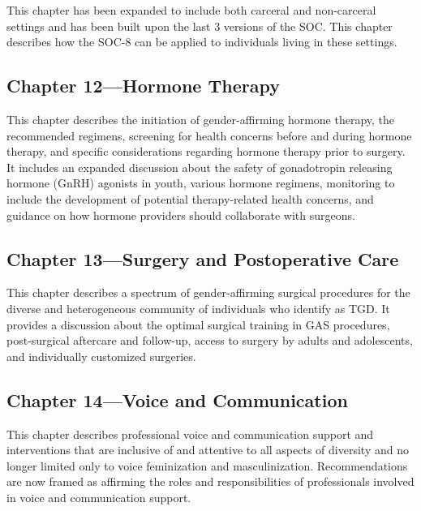 \documentclass[
]{book}
\begin{document}
This chapter has been expanded to include both
carceral and non-carceral settings and has been
built upon the last 3 versions of the SOC. This
chapter describes how the SOC-8 can be applied
to individuals living in these settings.

\hypertarget{chapter-12hormone-therapy}{%
\subsection*{Chapter 12---Hormone Therapy}\label{chapter-12hormone-therapy}}

This chapter describes the initiation of
gender-affirming hormone therapy, the recommended
regimens, screening for health concerns before and
during hormone therapy, and specific considerations
regarding hormone therapy prior to surgery. It
includes an expanded discussion about the safety of
gonadotropin releasing hormone (GnRH) agonists
in youth, various hormone regimens, monitoring to
include the development of potential therapy-related
health concerns, and guidance on how hormone
providers should collaborate with surgeons.

\hypertarget{chapter-13surgery-and-postoperative-care}{%
\subsection*{Chapter 13---Surgery and Postoperative Care}\label{chapter-13surgery-and-postoperative-care}}

This chapter describes a spectrum of
gender-affirming surgical procedures for the
diverse and heterogeneous community of individuals who identify as TGD. It provides a discussion about the optimal surgical training in
GAS procedures, post-surgical aftercare and
follow-up, access to surgery by adults and adolescents, and individually customized surgeries.

\hypertarget{chapter-14voice-and-communication}{%
\subsection*{Chapter 14---Voice and Communication}\label{chapter-14voice-and-communication}}

This chapter describes professional voice and communication support and interventions that are inclusive of and attentive to all aspects of diversity and
no longer limited only to voice feminization and
masculinization. Recommendations are now framed
as affirming the roles and responsibilities of professionals involved in voice and communication support.
\end{document}
